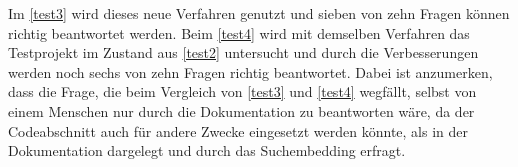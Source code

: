 \documentclass[../main.tex]{subfiles}
\begin{document}
Im \ref{test3} wird dieses neue Verfahren genutzt und sieben von zehn Fragen können richtig beantwortet werden.
Beim \ref{test4} wird mit demselben Verfahren das Testprojekt im Zustand aus \ref{test2} untersucht und durch die Verbesserungen werden noch sechs von zehn Fragen richtig beantwortet.
Dabei ist anzumerken, dass die Frage, die beim Vergleich von \ref{test3} und \ref{test4} wegfällt, selbst von einem Menschen nur durch die Dokumentation zu beantworten wäre, da der Codeabschnitt auch für andere Zwecke eingesetzt werden könnte, als in der Dokumentation dargelegt und durch das Suchembedding erfragt.
\end{document}
